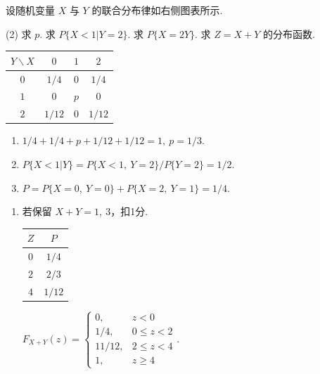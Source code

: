 \begin{textfig}[3:1]
  \begin{problem}[本题10分]
    设随机变量 $X$ 与 $Y$ 的联合分布律如右侧图表所示.
    \begin{tasks}[ label = \arabic*. ](2)
      \task 求 $p$.
      \task 求 $P\{X < 1 | Y = 2\}$.
      \task 求 $P\{X = 2Y\}$.
      \task 求 $Z = X + Y $ 的分布函数.
    \end{tasks}
  \end{problem}
  \textfigsplit\centering
  \renewcommand*\arraystretch{.6}
  \begin{tabular}{cccc}
    \toprule
    $Y \backslash X$ & $0$   & $1$ & $2$\\
    \midrule
    $0$                    & $1/4$ & $0$ & $1/4$\\
    $1$                    & $0$   & $p$ & $0$\\
    $2$                    & $1/12$& $0$ & $1/12$\\
    \bottomrule
  \end{tabular}
\end{textfig}
\begin{solution}\leavevmode\newline
  \begin{textfig}[1:1]\leavevmode
    \begin{enumerate}
      \item $1/4 + 1/4 + p + 1/12 + 1/12 = 1,~ p = 1/3$.
      \item $P\{X < 1|Y\} = P\{X < 1,~ Y = 2\}/P\{Y = 2\} = 1/2$.
      \item $P = P\{X = 0,~ Y = 0\} + P\{X = 2,~ Y = 1\} = 1/4$.
    \end{enumerate}
    \textfigsplit\centering
    \begin{enumerate}
      \addtocounter{enumi}{3}
      \item 若保留 $X + Y = 1,~ 3$，扣1分.
      
      \renewcommand*\arraystretch{.8}
      \begin{tabular}{cc}
        \toprule
        $Z$ & $P$\\
        \midrule
        $0$ & $1/4$\\
        $2$ & $2/3$\\
        $4$ & $1/12$\\
        \bottomrule
      \end{tabular}
      $F_{X + Y}(z) =
      \begin{cases}
        0,     & z < 0\\
        1/4,   & 0 \leq z < 2\\
        11/12, & 2 \leq z < 4\\
        1,     & z \geq 4
      \end{cases}$.
    \end{enumerate}
  \end{textfig}
\end{solution}


